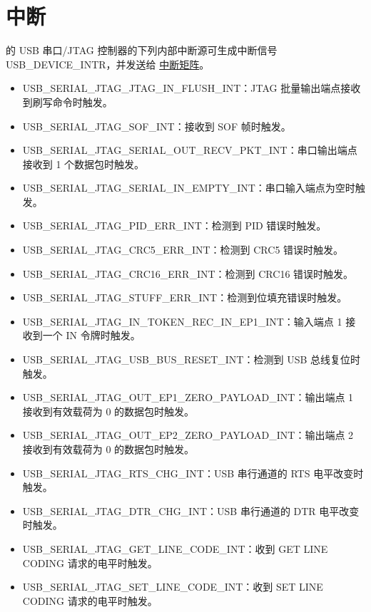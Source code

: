 \documentclass[main\_\_CN.tex]{subfiles}
\begin{document}
\section{中断}

\chipname{} 的 USB 串口/JTAG 控制器的下列内部中断源可生成中断信号 USB\_DEVICE\_INTR，并发送给 \hyperref[mod:intmtrx]{中断矩阵}。

\begin{itemize}
\item \label{int:USBSERIALJTAGJTAGINFLUSHINT}USB\_SERIAL\_JTAG\_JTAG\_IN\_FLUSH\_INT：JTAG 批量输出端点接收到刷写命令时触发。
\item \label{int:USBSERIALJTAGSOFINT}USB\_SERIAL\_JTAG\_SOF\_INT：接收到 SOF 帧时触发。
\item \label{int:USBSERIALJTAGSERIALOUTRECVPKTINT}USB\_SERIAL\_JTAG\_SERIAL\_OUT\_RECV\_PKT\_INT：串口输出端点接收到 1 个数据包时触发。
\item \label{int:USBSERIALJTAGSERIALINEMPTYINT}USB\_SERIAL\_JTAG\_SERIAL\_IN\_EMPTY\_INT：串口输入端点为空时触发。
\item \label{int:USBSERIALJTAGPIDERRINT}USB\_SERIAL\_JTAG\_PID\_ERR\_INT：检测到 PID 错误时触发。
\item \label{int:USBSERIALJTAGCRC5ERRINT}USB\_SERIAL\_JTAG\_CRC5\_ERR\_INT：检测到 CRC5 错误时触发。
\item \label{int:USBSERIALJTAGCRC16ERRINT}USB\_SERIAL\_JTAG\_CRC16\_ERR\_INT：检测到 CRC16 错误时触发。
\item \label{int:USBSERIALJTAGSTUFFERRINT}USB\_SERIAL\_JTAG\_STUFF\_ERR\_INT：检测到位填充错误时触发。
\item \label{int:USBSERIALJTAGINTOKENRECINEP1INT}USB\_SERIAL\_JTAG\_IN\_TOKEN\_REC\_IN\_EP1\_INT：输入端点 1 接收到一个 IN 令牌时触发。
\item \label{int:USBSERIALJTAGUSBBUSRESETINT}USB\_SERIAL\_JTAG\_USB\_BUS\_RESET\_INT：检测到 USB 总线复位时触发。
\item \label{int:USBSERIALJTAGOUTEP1ZEROPAYLOADINT}USB\_SERIAL\_JTAG\_OUT\_EP1\_ZERO\_PAYLOAD\_INT：输出端点 1 接收到有效载荷为 0 的数据包时触发。
\item \label{int:USBSERIALJTAGOUTEP2ZEROPAYLOADINT}USB\_SERIAL\_JTAG\_OUT\_EP2\_ZERO\_PAYLOAD\_INT：输出端点 2 接收到有效载荷为 0 的数据包时触发。
\item \label{int:USBSERIALJTAGRTSCHGINT}USB\_SERIAL\_JTAG\_RTS\_CHG\_INT：USB 串行通道的 RTS 电平改变时触发。
\item \label{int:USBSERIALJTAGDTRCHGINT}USB\_SERIAL\_JTAG\_DTR\_CHG\_INT：USB 串行通道的 DTR 电平改变时触发。
\item \label{int:USBSERIALJTAGGETLINECODEINT}USB\_SERIAL\_JTAG\_GET\_LINE\_CODE\_INT：收到 GET LINE CODING 请求的电平时触发。
\item \label{int:USBSERIALJTAGSETLINECODEINT}USB\_SERIAL\_JTAG\_SET\_LINE\_CODE\_INT：收到 SET LINE CODING 请求的电平时触发。
\end{itemize}
\end{document}
